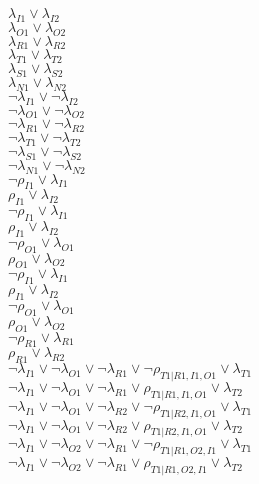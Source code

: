 $\lambda_{I1} \vee \lambda_{I2}$\\
$\lambda_{O1} \vee \lambda_{O2}$\\
$\lambda_{R1} \vee \lambda_{R2}$\\
$\lambda_{T1} \vee \lambda_{T2}$\\
$\lambda_{S1} \vee \lambda_{S2}$\\
$\lambda_{N1} \vee \lambda_{N2}$\\
$\neg\lambda_{I1} \vee \neg\lambda_{I2}$\\
$\neg\lambda_{O1} \vee \neg\lambda_{O2}$\\
$\neg\lambda_{R1} \vee \neg\lambda_{R2}$\\
$\neg\lambda_{T1} \vee \neg\lambda_{T2}$\\
$\neg\lambda_{S1} \vee \neg\lambda_{S2}$\\
$\neg\lambda_{N1} \vee \neg\lambda_{N2}$\\
$\neg\rho_{I1} \vee \lambda_{I1}$\\
$\rho_{I1} \vee \lambda_{I2}$\\
$\neg\rho_{I1} \vee \lambda_{I1}$\\
$\rho_{I1} \vee \lambda_{I2}$\\
$\neg\rho_{O1} \vee \lambda_{O1}$\\
$\rho_{O1} \vee \lambda_{O2}$\\
$\neg\rho_{I1} \vee \lambda_{I1}$\\
$\rho_{I1} \vee \lambda_{I2}$\\
$\neg\rho_{O1} \vee \lambda_{O1}$\\
$\rho_{O1} \vee \lambda_{O2}$\\
$\neg\rho_{R1} \vee \lambda_{R1}$\\
$\rho_{R1} \vee \lambda_{R2}$\\
$\neg\lambda_{I1} \vee \neg\lambda_{O1} \vee \neg\lambda_{R1} \vee \neg\rho_{T1|R1,I1,O1} \vee \lambda_{T1}$\\
$\neg\lambda_{I1} \vee \neg\lambda_{O1} \vee \neg\lambda_{R1} \vee \rho_{T1|R1,I1,O1} \vee \lambda_{T2}$\\
$\neg\lambda_{I1} \vee \neg\lambda_{O1} \vee \neg\lambda_{R2} \vee \neg\rho_{T1|R2,I1,O1} \vee \lambda_{T1}$\\
$\neg\lambda_{I1} \vee \neg\lambda_{O1} \vee \neg\lambda_{R2} \vee \rho_{T1|R2,I1,O1} \vee \lambda_{T2}$\\
$\neg\lambda_{I1} \vee \neg\lambda_{O2} \vee \neg\lambda_{R1} \vee \neg\rho_{T1|R1,O2,I1} \vee \lambda_{T1}$\\
$\neg\lambda_{I1} \vee \neg\lambda_{O2} \vee \neg\lambda_{R1} \vee \rho_{T1|R1,O2,I1} \vee \lambda_{T2}$\\
